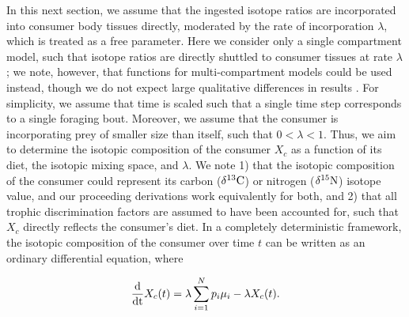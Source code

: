 \documentclass{article}
\begin{document}
In this next section, we assume that the ingested isotope ratios are incorporated into consumer body tissues directly, moderated by the rate of incorporation $\lambda$, which is treated as a free parameter.
Here we consider only a single compartment model, such that isotope ratios are directly shuttled to consumer tissues at rate $\lambda$; we note, however, that functions for multi-compartment models could be used instead, though we do not expect large qualitative differences in results \citep[cf. Fig. 1 in][]{delRio:2008bs}.
For simplicity, we assume that time is scaled such that a single time step corresponds to a single foraging bout.
Moreover, we assume that the consumer is incorporating prey of smaller size than itself, such that $ 0 < \lambda < 1$.
Thus, we aim to determine the isotopic composition of the consumer $X_c$ as a function of its diet, the isotopic mixing space, and $\lambda$.
We note 1) that the isotopic composition of the consumer could represent its carbon ($\delta^{13}{\rm C}$) or nitrogen ($\delta^{15}{\rm N}$) isotope value, and our proceeding derivations work equivalently for both, and 2) that all trophic discrimination factors are assumed to have been accounted for, such that $X_c$ directly reflects the consumer's diet.
In a completely deterministic framework, the isotopic composition of the consumer over time $t$ can be written as an ordinary differential equation, where

\begin{equation}
\label{eqODE}
\frac{\rm d}{\rm dt} X_c(t) = \lambda \sum_{i=1}^N p_i \mu_i - \lambda X_c(t).
\end{equation}
\end{document}
